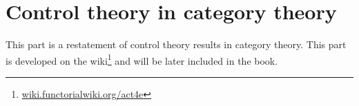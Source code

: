 \part{Control theory in category theory}

This part is a restatement of control theory results in category theory.
This part is developed on the wiki\footnote{\href{https://wiki.functorialwiki.org/act4e/}{wiki.functorialwiki.org/act4e}} and will be later included in the book.





%





\printbibliography